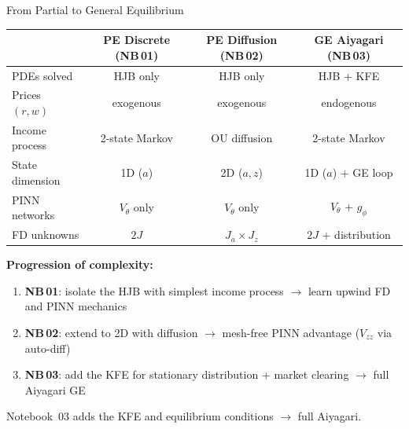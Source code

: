 \documentclass[aspectratio=169,11pt]{beamer}
\newcommand{\emphc}[1]{\textcolor{harvardcrimson}{#1}}
\begin{document}

\begin{frame}{From Partial to General Equilibrium}
\small
\begin{center}
\begin{tabular}{@{}l c c c@{}}
\toprule
& \textbf{PE Discrete (NB\,01)} & \textbf{PE Diffusion (NB\,02)} & \textbf{GE Aiyagari (NB\,03)} \\
\midrule
PDEs solved     & HJB only   & HJB only   & HJB + KFE \\
Prices $(r,w)$  & exogenous  & exogenous  & \emphc{endogenous} \\
Income process  & 2-state Markov & OU diffusion & 2-state Markov \\
State dimension & 1D ($a$)   & 2D ($a,z$) & 1D ($a$) + GE loop \\
PINN networks   & $V_\theta$ only & $V_\theta$ only & $V_\theta$ + $g_\phi$ \\
FD unknowns     & $2J$       & $J_a \times J_z$ & $2J$ + distribution \\
\bottomrule
\end{tabular}
\end{center}

\vspace{0.2em}
\textbf{Progression of complexity:}
\begin{enumerate}\itemsep0pt
  \item \textbf{NB\,01}: isolate the HJB with simplest income process $\to$
        learn upwind FD and PINN mechanics
  \item \textbf{NB\,02}: extend to 2D with diffusion $\to$
        mesh-free PINN advantage ($V_{zz}$ via auto-diff)
  \item \textbf{NB\,03}: add the \emphc{KFE} for stationary distribution +
        \emphc{market clearing} $\to$ full Aiyagari GE
\end{enumerate}

\vspace{0.1em}
\centering
\colorbox{uzhgreylight}{\parbox{0.75\textwidth}{\centering\small
Notebook~03 adds the KFE and equilibrium conditions $\to$ \emphc{full Aiyagari}.}}
\end{frame}
\end{document}
